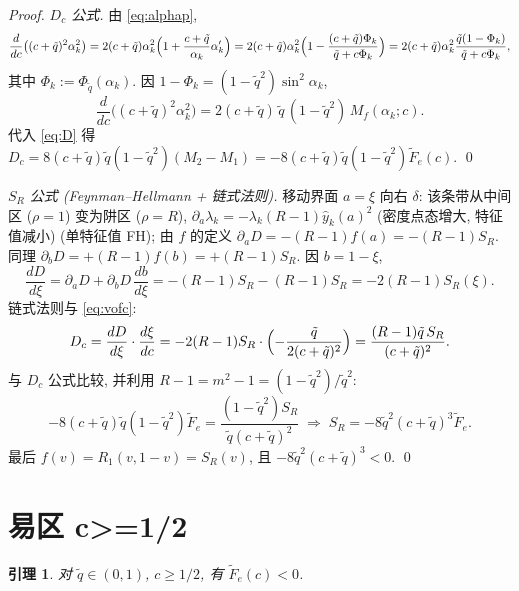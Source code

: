 \documentclass[UTF8]{ctexart}
\newtheorem{lemma}[theorem]{引理}
\begin{document}
\begin{proof}
\emph{$D_c$ 公式.} 由 \eqref{eq:alphap},
\begin{equation}
	\frac{d}{dc}\bigl((c+\tilde q)^2\alpha_k^2\bigr)
	=2(c+\tilde q)\alpha_k^2\Bigl(1+\frac{c+\tilde q}{\alpha_k}\alpha_k'\Bigr)
	=2(c+\tilde q)\alpha_k^2\Bigl(1-\frac{(c+\tilde q)\Phi_k}{\tilde q+c\Phi_k}\Bigr)
	=2(c+\tilde q)\alpha_k^2\frac{\tilde q(1-\Phi_k)}{\tilde q+c\Phi_k},
\end{equation}
其中 $\Phi_k:=\Phi_{\tilde q}(\alpha_k)$. 因 $1-\Phi_k=(1-\tilde q^2)\sin^2\alpha_k$,
\begin{equation}
	\frac{d}{dc}\bigl((c+\tilde q)^2\alpha_k^2\bigr)
	=2(c+\tilde q)\,\tilde q\,(1-\tilde q^2)\,M_f(\alpha_k;c).
\end{equation}
代入 \eqref{eq:D} 得 $D_c=8(c+\tilde q)\tilde q(1-\tilde q^2)(M_2-M_1)
=-8(c+\tilde q)\tilde q(1-\tilde q^2)\widetilde F_e(c)$. \qed

\emph{$S_R$ 公式 (Feynman--Hellmann + 链式法则).} 移动界面 $a=\xi$ 向右 $\delta$:
该条带从中间区 ($\rho=1$) 变为阱区 ($\rho=R$), $\partial_a\lambda_k=-\lambda_k(R-1)\hat y_k(a)^2$ (密度点态增大, 特征值减小)
(单特征值 FH); 由 $f$ 的定义 $\partial_a D=-(R-1)f(a)=-(R-1)S_R$.
同理 $\partial_b D=+(R-1)f(b)=+(R-1)S_R$. 因 $b=1-\xi$,
\begin{equation}
	\frac{dD}{d\xi}=\partial_aD+\partial_bD\,\frac{db}{d\xi}
	=-(R-1)S_R-(R-1)S_R=-2(R-1)S_R(\xi).
\end{equation}
链式法则与 \eqref{eq:vofc}:
\begin{equation}
	D_c=\frac{dD}{d\xi}\cdot\frac{d\xi}{dc}
	=-2(R-1)S_R\cdot\Bigl(-\frac{\tilde q}{2(c+\tilde q)^2}\Bigr)
	=\frac{(R-1)\tilde q\,S_R}{(c+\tilde q)^2}.
\end{equation}
与 $D_c$ 公式比较, 并利用 $R-1=m^2-1=(1-\tilde q^2)/\tilde q^2$:
\begin{equation}
	-8(c+\tilde q)\tilde q(1-\tilde q^2)\widetilde F_e
	=\frac{(1-\tilde q^2)S_R}{\tilde q(c+\tilde q)^2}
	\;\Longrightarrow\;
	S_R=-8\tilde q^2(c+\tilde q)^3\widetilde F_e.
\end{equation}
最后 $f(v)=R_1(v,1-v)=S_R(v)$, 且 $-8\tilde q^2(c+\tilde q)^3<0$. \qed
\end{proof}

\section{易区 c>=1/2}\label{sec:easy}

\begin{lemma}\label{lem:easy}
对 $\tilde q\in(0,1)$, $c\ge1/2$, 有 $\widetilde F_e(c)<0$.
\end{lemma}
\end{document}
